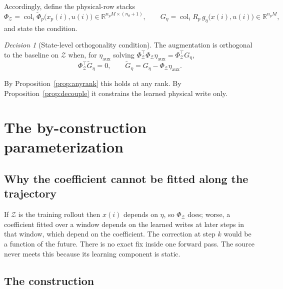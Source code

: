 \documentclass[11pt,a4paper]{article}
\newcommand{\R}{\mathbb R}
\newcommand{\col}{\operatorname{col}}
\theoremstyle{remark}
\newtheorem{decision}[proposition]{Decision}
\begin{document}
Accordingly, define the physical-row stacks
\begin{equation}\label{eq:phistack}
 \Phi_{\mathcal Z}=\col_i\widetilde\Phi_p\bigl(x_p(i),u(i)\bigr)\in\R^{n_pM\times(n_\theta+1)},
 \qquad
 G_\eta=\col_i R_p\,g_\eta\bigl(x(i),u(i)\bigr)\in\R^{n_pM},
\end{equation}
and state the condition.

\begin{decision}[State-level orthogonality condition]\label{dec:cond}
The augmentation is orthogonal to the baseline on $\mathcal Z$ when, for $\eta_{\mathrm{aux}}$
solving $\Phi_{\mathcal Z}^\top\Phi_{\mathcal Z}\eta_{\mathrm{aux}}=\Phi_{\mathcal Z}^\top G_\eta$,
\begin{equation}\label{eq:cond}
 \Phi_{\mathcal Z}^\top\widetilde G_\eta=0,
 \qquad \widetilde G_\eta=G_\eta-\Phi_{\mathcal Z}\eta_{\mathrm{aux}}.
\end{equation}
\end{decision}

By Proposition~\ref{prop:anyrank} this holds at any rank. By Proposition~\ref{prop:decouple} it
constrains the learned physical write only.

\section{The by-construction parameterization}\label{sec:construction}

\subsection{Why the coefficient cannot be fitted along the trajectory}

If $\mathcal Z$ is the training rollout then $x(i)$ depends on $\eta$, so
$\Phi_{\mathcal Z}$ does; worse, a coefficient fitted over a window depends on the learned writes
at later steps in that window, which depend on the coefficient. The correction at step $k$ would
be a function of the future. There is no exact fix inside one forward pass. The source never meets
this because its learning component is static.

\subsection{The construction}
\end{document}
